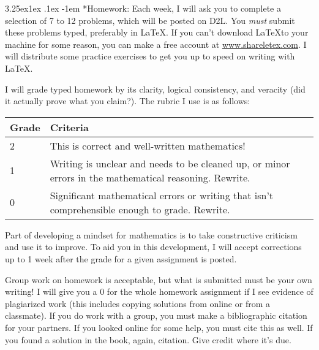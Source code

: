 \documentclass[11pt]{article}
\makeatletter
\renewcommand\subsection{%
  \@startsection{subsubsection}{3}{\z@}%
  {3.25ex\@plus 1ex \@minus .1ex}%
  {-1em}%
  {\normalfont\normalsize\bfseries}}
\makeatother
\begin{document}
\subsection*{Homework:} Each week, I will ask you to complete a
selection of 7 to 12 problems, which will be posted on D2L. You
\emph{must} submit these problems typed, preferably in \LaTeX. If you
can't download \LaTeX to your machine for some reason, you can make a
free account at \url{www.shareletex.com}. I will distribute some
practice exercises to get you up to speed on writing with \LaTeX.

I will grade typed homework by its clarity, logical consistency,
and veracity (did it actually prove what you claim?). The rubric I use
is as follows:\\

\begin{tabular}[h]{|l|l|}
  \rowcolor{cyan} Grade & Criteria \\ \hline 
2& This is correct and well-written mathematics!\\\hline
1 & \begin{minipage}[t]{0.75\textwidth} Writing is unclear and needs
  to be cleaned up, or minor errors in the mathematical reasoning. Rewrite.
  \end{minipage}\\\hline
0 & \begin{minipage}[t]{0.75\textwidth} Significant mathematical
  errors or writing that isn't comprehensible enough to grade. Rewrite.\end{minipage}\\
\hline
\end{tabular}

Part of developing a mindset for mathematics is to take constructive
criticism and use it to improve. To aid you in this development, I
will accept corrections up to 1 week after the grade for a given assignment is posted. 

Group work on homework is acceptable, but what is submitted must be
your own writing! I will give you a 0 for the whole homework
assignment if I see evidence of plagiarized work (this includes
copying solutions from online or from a classmate). If you do work
with a group, you must make a bibliographic citation for your
partners. If you looked online for some help, you must cite this as
well. If you found a solution in the book, again, citation. Give
credit where it's due.
\end{document}
